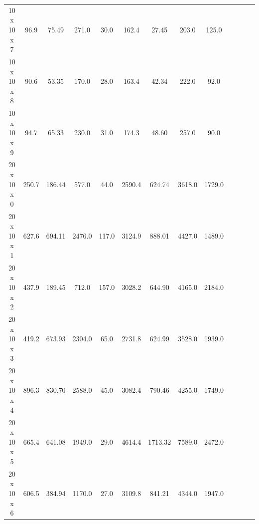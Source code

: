 \documentclass{article}
\begin{document}
\begin{table}[]
\begin{tabular}{ccccccccccccc}
	    		10     x 10   x 7   & 96.9                         & 75.49            & 271.0                    & 30.0                     & 162.4                        & 27.45           & 203.0                    & 125.0                    \\
	    		10     x 10   x 8   & 90.6                         & 53.35          & 170.0                    & 28.0                     & 163.4                        & 42.34            & 222.0                    & 92.0                     \\
	    		10     x 10   x 9   & 94.7                         & 65.33            & 230.0                    & 31.0                     & 174.3                        & 48.60           & 257.0                    & 90.0                     \\
	    		20     x 10   x 0   & 250.7                        & 186.44           & 577.0                    & 44.0                     & 2590.4                       & 624.74            & 3618.0                   & 1729.0                   \\
	    		20     x 10   x 1   & 627.6                        & 694.11            & 2476.0                   & 117.0                    & 3124.9                       & 888.01            & 4427.0                   & 1489.0                   \\
	    		20     x 10   x 2   & 437.9                        & 189.45           & 712.0                    & 157.0                    & 3028.2                       & 644.90            & 4165.0                   & 2184.0                   \\
	    		20     x 10   x 3   & 419.2                        & 673.93             & 2304.0                   & 65.0                     & 2731.8                       & 624.99            & 3528.0                   & 1939.0                   \\
	    		20     x 10   x 4   & 896.3                        & 830.70         & 2588.0                   & 45.0                     & 3082.4                       & 790.46            & 4255.0                   & 1749.0                   \\
	    		20     x 10   x 5   & 665.4                        & 641.08             & 1949.0                   & 29.0                     & 4614.4                       & 1713.32          & 7589.0                   & 2472.0                   \\
	    		20     x 10   x 6   & 606.5                        & 384.94           & 1170.0                   & 27.0                     & 3109.8                       & 841.21            & 4344.0                   & 1947.0                   \\

\end{tabular}
\end{table}
\end{document}
